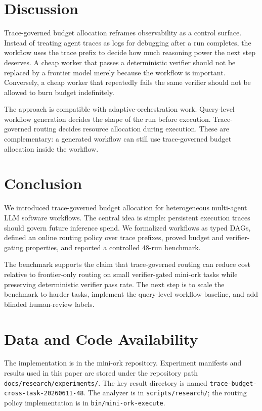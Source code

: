 \documentclass[11pt]{article}
\begin{document}
\section{Discussion}

Trace-governed budget allocation reframes observability as a control surface.
Instead of treating agent traces as logs for debugging after a run completes,
the workflow uses the trace prefix to decide how much reasoning power the next
step deserves. A cheap worker that passes a deterministic verifier should not
be replaced by a frontier model merely because the workflow is important.
Conversely, a cheap worker that repeatedly fails the same verifier should not
be allowed to burn budget indefinitely.

The approach is compatible with adaptive-orchestration work. Query-level
workflow generation decides the shape of the run before execution.
Trace-governed routing decides resource allocation during execution. These are
complementary: a generated workflow can still use trace-governed budget
allocation inside the workflow.

\section{Conclusion}

We introduced trace-governed budget allocation for heterogeneous multi-agent
LLM software workflows. The central idea is simple: persistent execution traces
should govern future inference spend. We formalized workflows as typed DAGs,
defined an online routing policy over trace prefixes, proved budget and
verifier-gating properties, and reported a controlled 48-run benchmark.

The benchmark supports the claim that trace-governed routing can reduce cost
relative to frontier-only routing on small verifier-gated mini-ork tasks while
preserving deterministic verifier pass rate. The next step is to scale the
benchmark to harder tasks, implement the query-level workflow baseline, and add
blinded human-review labels.

\section*{Data and Code Availability}

The implementation is in the mini-ork repository. Experiment manifests and
results used in this paper are stored under the repository path
\texttt{docs/research/experiments/}. The key result directory is named
\texttt{trace-budget-cross-task-20260611-48}. The analyzer is in
\texttt{scripts/research/}; the routing policy implementation is in
\texttt{bin/mini-ork-execute}.
\end{document}
